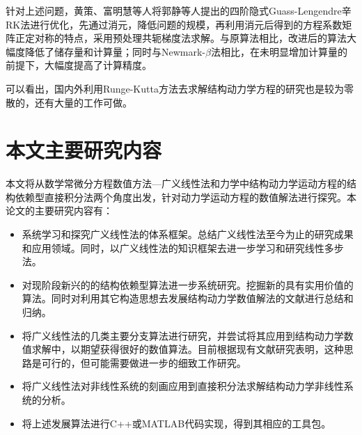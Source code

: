 针对上述问题，黄策、富明慧\cite{HuangCe2016a}等人将郭静等人提出的四阶隐式Guass-Lengendre辛RK法进行优化，先通过消元，降低问题的规模，再利用消元后得到的方程系数矩阵正定对称的特点，采用预处理共轭梯度法求解。与原算法相比，改进后的算法大幅度降低了储存量和计算量；同时与Newmark-$\beta$法相比，在未明显增加计算量的前提下，大幅度提高了计算精度。

可以看出，国内外利用Runge-Kutta方法去求解结构动力学方程的研究也是较为零散的，还有大量的工作可做。
\section{本文主要研究内容}
本文将从数学常微分方程数值方法—广义线性法和力学中结构动力学运动方程的结构依赖型直接积分法两个角度出发，针对动力学运动方程的数值解法进行探究。本论文的主要研究内容有：
\begin{itemize}
\item 系统学习和探究广义线性法的体系框架。总结广义线性法至今为止的研究成果和应用领域。同时，以广义线性法的知识框架去进一步学习和研究线性多步法。
\item 对现阶段新兴的的结构依赖型算法进一步系统研究。挖掘新的具有实用价值的算法。同时对利用其它构造思想去发展结构动力学数值解法的文献进行总结和归纳。
\item 将广义线性法的几类主要分支算法进行研究，并尝试将其应用到结构动力学数值求解中，以期望获得很好的数值算法。目前根据现有文献研究表明，这种思路是可行的，但可能需要做进一步的细致工作研究。
\item 将广义线性法对非线性系统的刻画应用到直接积分法求解结构动力学非线性系统的分析。
\item 将上述发展算法进行C++或MATLAB代码实现，得到其相应的工具包。
\end{itemize}
